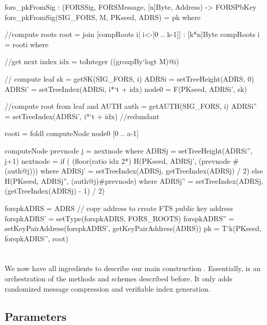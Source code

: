 \begin{code}
  fors_pkFromSig : (FORSSig, FORSMessage, [n]Byte, Address) -> FORSPbKey
  fors_pkFromSig(SIG_FORS, M, PKseed, ADRS) = pk where

    //compute roots
    root = join [compRoots i| i<-[0 .. k-1]] : [k*n]Byte
    compRoots i = rooti where

      //get next index
      idx = toInteger ((groupBy`{logt} M)@i)

      // compute leaf
      sk = getSK(SIG_FORS, i)
      ADRSi = setTreeHeight(ADRS, 0)
      ADRSi' = setTreeIndex(ADRSi, i*`t + idx)
      node0 = F(PKseed, ADRSi', sk)

      //compute root from leaf and AUTH
      auth = getAUTH(SIG_FORS, i)
      ADRSi'' = setTreeIndex(ADRSi', i*`t + idx) //redundant

      rooti = foldl computeNode node0 [0 .. a-1]

      computeNode prevnode j = nextnode where
        ADRSj = setTreeHeight(ADRSi'', j+1)
        nextnode =
          if ( (floor(ratio idx 2^^j) %
            H(PKseed, ADRSj', (prevnode # (auth@j))) where
              ADRSj' = setTreeIndex(ADRSj, getTreeIndex(ADRSj) / 2)
          else
            H(PKseed, ADRSj'', (auth@j)#prevnode) where
              ADRSj'' = setTreeIndex(ADRSj, (getTreeIndex(ADRSj) - 1) / 2)

    forspkADRS = ADRS // copy address to create FTS public key address
    forspkADRS' = setType(forspkADRS, FORS_ROOTS)
    forspkADRS'' = setKeyPairAddress(forspkADRS', getKeyPairAddress(ADRS))
    pk = T`{k}(PKseed, forspkADRS'', root)
\end{code}

\section{\spx}
\label{sec:spx}
We now have all ingredients to describe our main construction \spx.
Essentially, \spx is an orchestration of the methods and schemes described
before. It only adds randomized message compression and verifiable index
generation.

\subsection{\spx Parameters}

